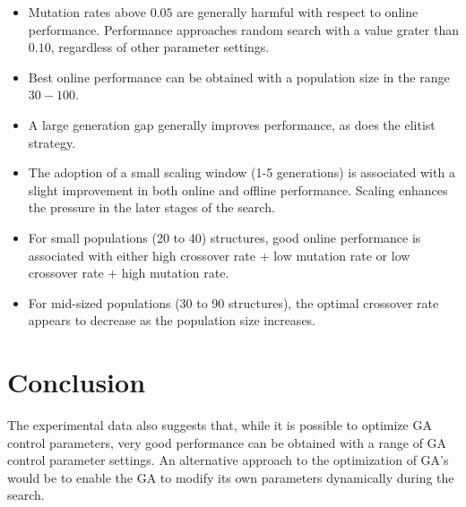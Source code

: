 \documentclass[../main.tex]{subfiles}
\begin{document}
\begin{itemize}
	\item Mutation rates above $0.05$ are generally harmful with respect to online performance. Performance approaches
	random search with a value grater than $0.10$, regardless of other parameter settings.
	\item Best online performance can be obtained with a population size in the range $30 - 100$.
	\item A large generation gap generally improves performance, as does the elitist strategy.
	\item The adoption of a small scaling window (1-5 generations) is associated with a slight improvement in both
	online and offline performance. Scaling enhances the pressure in the later stages of the search.
	\item For small populations (20 to 40) structures, good online performance is associated with either high crossover
	rate + low mutation rate or low crossover rate + high mutation rate.
	\item For mid-sized populations (30 to 90 structures), the optimal crossover rate appears to decrease as the
	population size increases.
\end{itemize}

\section{Conclusion}
The experimental data also suggests that, while it is possible to optimize GA control parameters, very good
performance can be obtained with a range of GA control parameter settings. An alternative approach to the optimization
of GA's would be to enable the GA to modify its own parameters dynamically
during the search.
\end{document}
